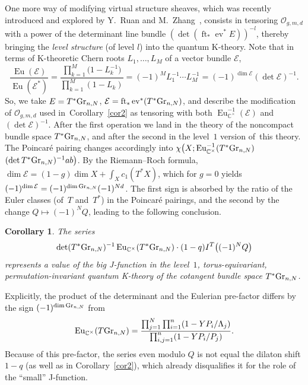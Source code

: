 \documentclass[10pt,a4paper]{amsart}
\numberwithin{equation}{section}
\newtheorem{Corollary}[Theorem]{Corollary}
\def\E{\mathcal E}
\def\O{\mathcal O}
\def\CC{\mathbb C}
\def\det{\operatorname{det}}
\def\ev{\operatorname{ev}}
\def\ft{\operatorname{ft}}
\def\Eu{\operatorname{Eu}}
\theoremstyle{definition}
\theoremstyle{plain}
\begin{document}
One more way of modifying virtual structure sheaves, which was recently introduced and explored by Y.~Ruan and M.~Zhang~\cite{R-Z}, consists in tensoring $\O_{g,m,d}$ with a power of the determinant line bundle $(\det (\ft_*\ev^*E))^{-l}$, thereby bringing the {\em level structure} (of level $l$) into the quantum K-theory. Note that in terms of K-theoretic Chern roots $L_1,\dots, L_M$ of a vector bundle $\E$,
\[
\frac{\Eu (\E)}{\Eu (\E^*)}=\frac{\prod_{k=1}^M \big(1-L_k^{-1}\big)}{\prod_{k=1}^M(1-L_k)}
=(-1)^M L_1^{-1}\cdots L_M^{-1} =(-1)^{\dim \E} (\det \E)^{-1}.
\]
So, we take $E=T^*{\rm Gr}_{n,N}$, $\E=\ft_*\ev^*(T^*{\rm Gr}_{n,N})$, and describe the modification of $\O_{g,m,d}$ used in~Corollary~\ref{cor2} as tensoring with both $\Eu^{-1}_{\CC^{\times}}(\E)$ and $(\det \E)^{-1}$.
After the first operation we land in~the theory of the noncompact bundle space $T^*{\rm Gr}_{n,N}$, and after the second in the level~$1$ version of~this theory. The Poincar\'e pairing changes accordingly into $\chi \big(X; \Eu^{-1}_{\CC^{\times}}(T^*{\rm Gr}_{n,N})$ $(\det T^*{\rm Gr}_{n,N})^{-1} ab\big)$. By the Riemann--Roch formula, $\dim \E = (1-g)\dim X+\int_X c_1(T^*X)$, which for $g=0$ yields $(-1)^{\dim \E}=(-1)^{\dim {\rm Gr}_{n,N}}(-1)^{Nd}$. The first sign is absorbed by the ratio of the Euler classes (of~$T$ and~$T^*$) in the Poincar\'e pairings, and the second by the change $Q\mapsto (-1)^N Q$, leading to the following conclusion.

\begin{Corollary}\label{cor3}
The series
\[
\det (T^*{\rm Gr}_{n,N})^{-1}\Eu_{\CC^{\times}}(T^*{\rm Gr}_{n,N})\cdot (1-q) I^T\big((-1)^N Q\big)
\]
represents a value of the big J-function in the level~$1$, torus-equivariant, permutation-invariant quantum K-theory of the cotangent bundle space $T^*{\rm Gr}_{n,N}$.
\end{Corollary}

Explicitly, the product of the determinant and the Eulerian pre-factor differs by the sign $(-1)^{\dim {\rm Gr}_{n,N}}$ from
\[
\Eu_{\CC^{\times}}(T{\rm Gr}_{n,N})=\frac{\prod_{j=1}^N\prod_{i=1}^n(1-YP_i/\Lambda_j)}{\prod_{i,j=1}^n(1-Y P_i/P_j)}.
\]
Because of this pre-factor, the series even modulo $Q$ is not equal the dilaton shift $1-q$ (as well as in Corollary~\ref{cor2}), which already disqualifies it for the role of the ``small'' J-function.
\end{document}
